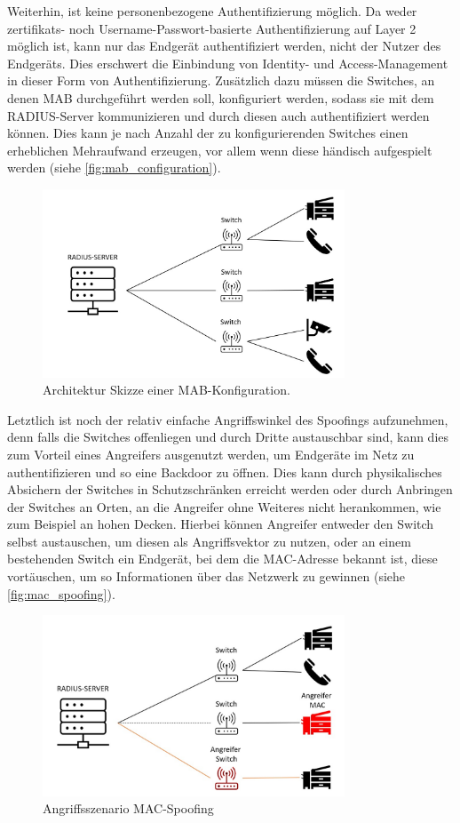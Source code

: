 \documentclass[conference]{IEEEtran}
\begin{document}
Weiterhin, ist keine personenbezogene Authentifizierung möglich. Da weder zertifikats- noch Username-Passwort-basierte Authentifizierung auf Layer 2 möglich ist, kann nur das Endgerät authentifiziert werden, nicht der Nutzer des Endgeräts. Dies erschwert die Einbindung von Identity- und Access-Management in dieser Form von Authentifizierung. Zusätzlich dazu müssen die Switches, an denen MAB durchgeführt werden soll, konfiguriert werden, sodass sie mit dem RADIUS-Server kommunizieren und durch diesen auch authentifiziert werden können. Dies kann je nach Anzahl der zu konfigurierenden Switches einen erheblichen Mehraufwand erzeugen, vor allem wenn diese händisch aufgespielt werden (siehe \autoref{fig:mab_configuration}).\\

\begin{figure}[hbt]
	\centering
	\includegraphics[width=9cm]{figures/Server_Switch.jpg}
	\caption{Architektur Skizze einer MAB-Konfiguration.}
	\label{fig:mab_configuration}
\end{figure}

Letztlich ist noch der relativ einfache Angriffswinkel des Spoofings aufzunehmen, denn falls die Switches offenliegen und durch Dritte austauschbar sind, kann dies zum Vorteil eines Angreifers ausgenutzt werden, um Endgeräte im Netz zu authentifizieren und so eine Backdoor zu öffnen. Dies kann durch physikalisches Absichern der Switches in Schutzschränken erreicht werden oder durch Anbringen der Switches an Orten, an die Angreifer ohne Weiteres nicht herankommen, wie zum Beispiel an hohen Decken. Hierbei können Angreifer entweder den Switch selbst austauschen, um diesen als Angriffsvektor zu nutzen, oder an einem bestehenden Switch ein Endgerät, bei dem die MAC-Adresse bekannt ist, diese vortäuschen, um so Informationen über das Netzwerk zu gewinnen (siehe \autoref{fig:mac_spoofing}).\\

\begin{figure}[hbt]
	\centering
	\includegraphics[width=9cm]{figures/Angriffsszenario_Spoofing.jpg}
	\caption{Angriffsszenario MAC-Spoofing}
	\label{fig:mac_spoofing}
\end{figure}
\end{document}
